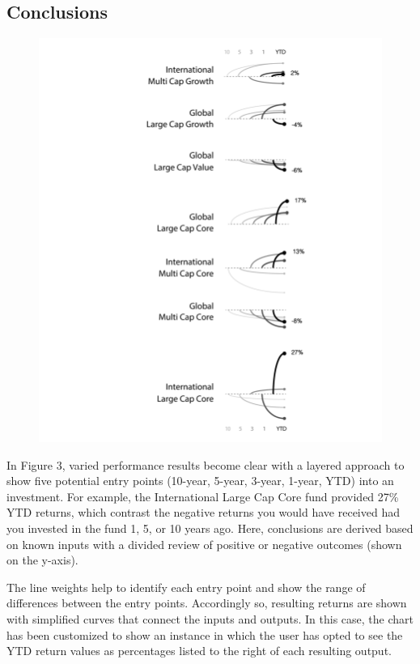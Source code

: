 \documentclass[]{book}
\theoremstyle{definition}
\theoremstyle{definition}
\theoremstyle{definition}
\theoremstyle{remark}
\begin{document}
\subsection{Conclusions}\label{conclusions}

\begin{figure}
\centering
\includegraphics{images/pattern-3.png}
\caption{}
\end{figure}

In Figure 3, varied performance results become clear with a layered
approach to show five potential entry points (10-year, 5-year, 3-year,
1-year, YTD) into an investment. For example, the International Large
Cap Core fund provided 27\% YTD returns, which contrast the negative
returns you would have received had you invested in the fund 1, 5, or 10
years ago. Here, conclusions are derived based on known inputs with a
divided review of positive or negative outcomes (shown on the y-axis).

The line weights help to identify each entry point and show the range of
differences between the entry points. Accordingly so, resulting returns
are shown with simplified curves that connect the inputs and outputs. In
this case, the chart has been customized to show an instance in which
the user has opted to see the YTD return values as percentages listed to
the right of each resulting output.
\end{document}
